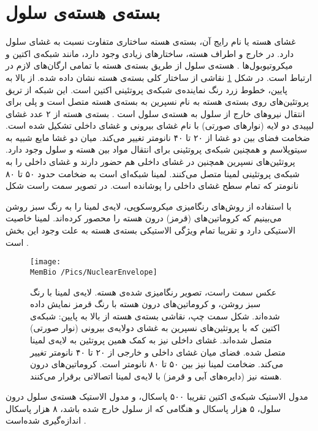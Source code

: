 \setRL


\section{\label{sec:nuclearenvelope}
بسته‌ی هسته‌ی سلول
}
غشای هسته یا نام رایج آن، بسته‌ی هسته
ساختاری متفاوت نسبت به غشای سلول دارد. در خارج و اطراف هسته، ساختارهای زیادی وجود دارد، مانند شبکه‌ی اکتین
 و میکروتیوبول‌ها
. هسته‌ی سلول از طریق بسته‌ی هسته با تمامی‌ ارگان‌های لازم در ارتباط است. در شکل 
\ref{fig:nuclearenvelope}
نقاشی از ساختار کلی بسته‌ی هسته نشان داده شده. از بالا به پایین، خطوط زرد رنگ نماینده‌ی شبکه‌ی پروتئینی اکتین است. این شبکه از تریق پروتئین‌های روی بسته‌ی هسته به نام نسپرین
به بسته‌ی هسته متصل است و پلی برای انتقال نیرو‌های خارج از سلول به هسته‌ی سلول است
\cite{Lammerding2011}
. بسته‌ی هسته از ۲ عدد غشای لیپیدی دو لایه (نوارهای صورتی) با نام غشای بیرونی و غشای داخلی تشکیل شده است. ضخامت فضای بین دو غشا از ۲۰ تا ۴۰ نانومتر تغییر می‌کند. میان دو غشا مایع شبیه به سیتوپلاسم و همچنین شبکه‌ی پروتئینی برای انتقال مواد بین هسته و سلول وجود دارد. پروتئین‌های نسپرین همچنین در غشای داخلی هم حضور دارند و غشای داخلی را به شبکه‌ی پروتئینی لمینا
متصل می‌کنند. لمینا‌ شبکه‌ای است به ضخامت حدود ۵۰ تا ۸۰ نانومتر که تمام سطح غشای داخلی را پوشانده است. در تصویر سمت راست شکل 

با استفاده از روش‌های رنگامیزی میکروسکوپی، لایه‌ی لمینا را به رنگ سبز روشن می‌بینیم که کروماتین‌های (قرمز) درون هسته را محصور کرده‌اند. لمینا خاصیت الاستیکی دارد و تقریبا تمام ویژگی الاستیکی بسته‌ی هسته به علت وجود این بخش است
\cite{Steensel2017wd}
. 


\begin{figure}[h]
\begin{center}
\texttt{[image: \\MemBio /Pics/NuclearEnvelope]}
\caption{
عکس سمت راست، تصویر رنگامیزی شده‌ی هسته. لایه‌ی لمینا با رنگ سبز روشن، و کروماتین‌های درون هسته با رنگ قرمز نمایش داده‌ شده‌اند. شکل سمت چپ، نقاشی بسته‌ی هسته از بالا به پایین: شبکه‌ی اکتین که با پروتئین‌های نسپرین به غشای دولایه‌ی بیرونی (نوار صورتی) متصل شده‌اند. غشای داخلی نیز به کمک همین پروتئین به لایه‌ی لمینا متصل شده. فضای میان غشای داخلی و خارجی از ۲۰ تا ۴۰ نانومتر تغییر می‌کند. ضخامت لمینا نیز بین ۵۰ تا ۸۰ نانومتر است. کروماتین‌های درون هسته نیز (دایره‌های آبی و قرمز) با لایه‌ی لمینا اتصالاتی برقرار می‌کنند. 
}
\label{fig:nuclearenvelope}
\end{center}
\end{figure}
مدول الاستیک شبکه‌ی اکتین تقریبا ۵۰۰ پاسکال، و مدول الاستیک هسته‌ی سلول درون سلول، ۵ هزار پاسکال و هنگامی ‌که از سلول خارج شده باشد، ۸ هزار پاسکال اندازه‌گیری شده‌است
\cite{Dahl2004, CAILLE2002177}
.







